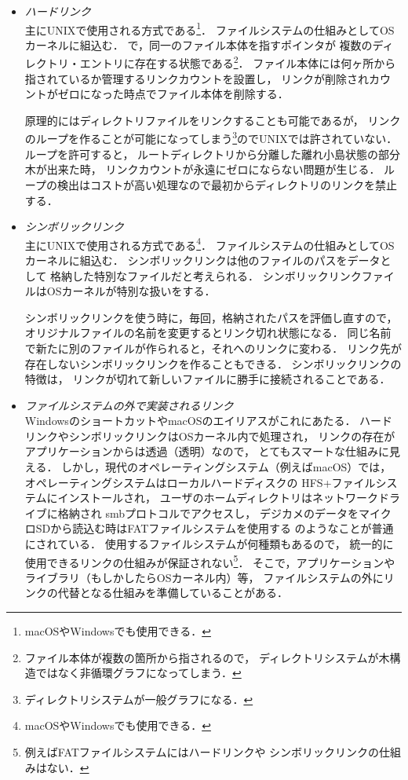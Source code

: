 \begin{itemize}
\item \emph{ハードリンク} \\
  主にUNIXで使用される方式である\footnote{macOSやWindowsでも使用できる．}．
  ファイルシステムの仕組みとしてOSカーネルに組込む．
  で，同一のファイル本体を指すポインタが
  複数のディレクトリ・エントリに存在する状態である\footnote{
    ファイル本体が複数の箇所から指されるので，
    ディレクトリシステムが木構造ではなく非循環グラフになってしまう．}．
  ファイル本体には何ヶ所から指されているか管理するリンクカウントを設置し，
  リンクが削除されカウントがゼロになった時点でファイル本体を削除する．

  原理的にはディレクトリファイルをリンクすることも可能であるが，
  リンクのループを作ることが可能になってしまう\footnote{
    ディレクトリシステムが一般グラフになる．}のでUNIXでは許されていない．
  ループを許可すると，
  ルートディレクトリから分離した離れ小島状態の部分木が出来た時，
  リンクカウントが永遠にゼロにならない問題が生じる．
  ループの検出はコストが高い処理なので最初からディレクトリのリンクを禁止する．

\item \emph{シンボリックリンク} \\
  主にUNIXで使用される方式である\footnote{macOSやWindowsでも使用できる．}．
  ファイルシステムの仕組みとしてOSカーネルに組込む．
  シンボリックリンクは他のファイルのパスをデータとして
  格納した特別なファイルだと考えられる．
  シンボリックリンクファイルはOSカーネルが特別な扱いをする．

  シンボリックリンクを使う時に，毎回，格納されたパスを評価し直すので，
  オリジナルファイルの名前を変更するとリンク切れ状態になる．
  同じ名前で新たに別のファイルが作られると，それへのリンクに変わる．
  リンク先が存在しないシンボリックリンクを作ることもできる．
  シンボリックリンクの特徴は，
  リンクが切れて新しいファイルに勝手に接続されることである．

\item \emph{ファイルシステムの外で実装されるリンク} \\
  WindowsのショートカットやmacOSのエイリアスがこれにあたる．
  ハードリンクやシンボリックリンクはOSカーネル内で処理され，
  リンクの存在がアプリケーションからは透過（透明）なので，
  とてもスマートな仕組みに見える．
  しかし，現代のオペレーティングシステム（例えばmacOS）では，
  オペレーティングシステムはローカルハードディスクの
  HFS+ファイルシステムにインストールされ，
  ユーザのホームディレクトリはネットワークドライブに格納され
  smbプロトコルでアクセスし，
  デジカメのデータをマイクロSDから読込む時はFATファイルシステムを使用する
  のようなことが普通にされている．
  使用するファイルシステムが何種類もあるので，
  統一的に使用できるリンクの仕組みが保証されない\footnote{
    例えばFATファイルシステムにはハードリンクや
    シンボリックリンクの仕組みはない．}．
  そこで，アプリケーションやライブラリ（もしかしたらOSカーネル内）等，
  ファイルシステムの外にリンクの代替となる仕組みを準備していることがある．


\end{itemize}
